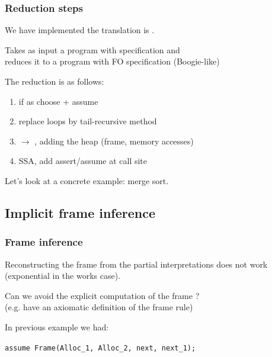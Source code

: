 \documentclass{beamer}
\begin{document}
\begin{frame}
  \frametitle{Reduction steps}

  We have implemented the translation is \Tool.

  \vspace{1ex}

  Takes as input a program with \JoshLogic specification and\\
  reduces it to a program with FO specification (Boogie-like)

  \vspace{1ex}
  The reduction is as follows:
  \begin{enumerate}
  \item if as choose + assume
  \item replace loops by tail-recursive method
  \item \JoshLogic $\rightarrow$ \LRJQ, adding the heap (frame, memory accesses)
  \item SSA, add assert/assume at call site
  \end{enumerate}

  \vspace{2ex}

  Let's look at a concrete example: merge sort.
\end{frame}

\subsection{Implicit frame inference}

\begin{frame}
  \frametitle{Frame inference}

  Reconstructing the frame from the partial interpretations does not work (exponential in the works case).

  \vspace{1ex}
  
  Can we avoid the explicit computation of the frame ?\\
  (e.g. have an axiomatic definition of the frame rule)

  \vspace{1ex}

  In previous example we had:
  \begin{center}
  \texttt{assume Frame(Alloc\_1, Alloc\_2, next, next\_1);}
  \end{center}

\end{frame}
\end{document}
